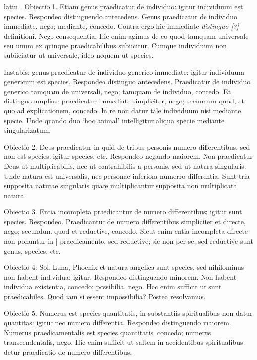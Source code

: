 \begin{otherlanguage*}{latin}
\pstart
 \textnormal{|} Obiectio 1. Etiam genus praedicatur de individuo: igitur individuum est species. Respondeo distinguendo antecedens. Genus praedicatur de individuo immediate, nego; mediante, concedo. Contra ergo hic immediate \emph{distinguo [?]} definitioni. Nego consequentia. Hic enim agimus de eo quod tamquam universale seu unum ex quinque praedicabilibus subiicitur. Cumque individuum non subiiciatur ut universale, ideo nequem ut species. 
\pend

\pstart
 Instabis: genus praedicatur de individuo generico immediate: igitur individuum genericum est species. Respondeo distinguo antecedens. Praedicatur de individuo generico tamquam de universali, nego; tamquam de individuo, concedo. Et distinguo amplius: praedicatur immediate simpliciter, nego; secundum quod, et quo ad explicationem, concedo. In re non datur tale individuum nisi mediante specie. Unde quando duo `hoc animal' intelligitur aliqua specie mediante singularizatum. 
\pend

\pstart
 Obiectio 2. Deus praedicatur in quid de tribus personis numero differentibus, sed non est species: igitur species, etc. Respondeo negando maiorem. Non praedicatur Deus ut multiplicabilis, nec ut contrahibilis a personis, sed ut natura singularis. Unde natura est universalis, nec personae inferiora numerro differentia. Sunt tria supposita naturae singularis quare multiplicantur supposita non multiplicata natura. 
\pend

\pstart
 Obiectio 3. Entia incompleta praedicantur de numero differentibus: igitur sunt species. Respondeo. Praedicantur de numero differentibus simpliciter et directe, nego; secundum quod et reductive, concedo. Sicut enim entia incompleta directe non ponuntur in \textnormal{|}   praedicamento, sed reductive; sic non per se, sed reductive sunt genus, species, etc. 
\pend

\pstart
 Obiectio 4: Sol, Luna, Phoenix et natura angelica sunt species, sed nihilominus non habent individua: igitur. Respondeo distinguendo minorem. Non habent individua existentia, concedo; possibilia, nego. Hoc enim sufficit ut sunt praedicabiles. Quod iam si essent impossibilia? Postea resolvamus. 
\pend

\pstart
 Obiectio 5. Numerus est species quantitatis, in substantiis spiritualibus non datur quantitas: igitur nec numero differentia. Respondeo distinguendo maiorem. Numerus praedicamentalis est species quantitatis, concedo; numerus transcendentalis, nego. Hic enim sufficit ut saltem in accidentibus spiritualibus detur praedicatio de numero differentibus. 
\pend


\end{otherlanguage*}
